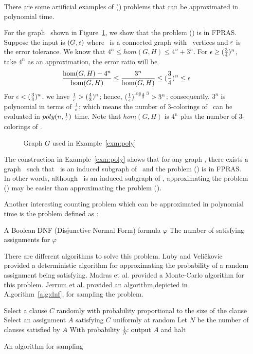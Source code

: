 There are some artificial examples of \ccsp(\mrelset) problems that can be approximated 
in polynomial time. 

\begin{example} \label{exm:poly}
For the graph \mH\ shown in Figure~\ref{fig:approxible},
we show that the problem \chom(\mH) is in FPRAS\@. Suppose the input is 
\((G,\epsilon)\) where \mG\ is a connected graph with \mn\ vertices and \(\epsilon\)
is the error tolerance.
We know that 
\(4^n\le hom(G,H) \le 4^n+3^n\)\@.
For \(\epsilon \ge (\frac{3}{4})^n\), take \(4^n\) as an approximation, the error ratio will  be
\[\frac{\hom(G,H)-4^n}{\hom(G,H)} \le \frac{3^n}{\hom(G,H)} \le (\frac{3}{4})^n \le \epsilon\]
For \(\epsilon < (\frac{3}{4})^n\), we have \(\frac{1}{\epsilon}>(\frac{4}{3})^n \);
hence, \((\frac{1}{\epsilon})^{\log_{\frac{4}{3}}3} > 3^n\); consequently, \(3^n\) is polynomial 
in terms of \(\frac{1}{\epsilon}\); which means the number of 3-colorings of \mG\ can be evaluated in 
\(poly(n,\frac{1}{\epsilon})\) time. 
Note that \(hom(G,H)\) is \(4^n\) plus the number of 3-colorings of \mG\@.

\begin{figure}[h] 
\center
\caption{Graph \ensuremath{G} used in Example~\ref{exm:poly}}
\label{fig:approxible}
\end{figure}
\end{example}

The construction in Example~\ref{exm:poly} shows that for any graph \mG,
there exists a graph \mH\ such that \mG\
is an induced subgraph of \mH\ and the problem \chom(\mH) is in FPRAS\@.
In other words, although \mG\ is an induced subgraph of \mH, approximating
the problem \chom(\mH)
may be easier than approximating the problem \chom(\mG)\@.

Another interesting counting problem which can be approximated in polynomial time is 
the \pname{\#Dual-SAT} problem defined as :

\pnndef %
{A Boolean DNF (Disjunctive Normal Form) formula \(\varphi\)}
{The number of satisfying assignments for \(\varphi\)}

There are different algorithms to solve this problem.
Luby and Veli\v{c}kovic \cite{Luby} provided a deterministic algorithm for
approximating the probability of a random assignment being satisfying. 
Madras et al. \cite{Madras} provided a Monte-Carlo algorithm
for this problem. Jerrum et al. \cite{JVV} provided an algorithm,depicted in Algorithm~\ref{alg:dnf},
for sampling the \pname{Dual-SAT} problem. 
\begin{algorithm}[h]
\begin{algorithmic}
       \STATE Select a clause \(C\) randomly with probability proportional to the size of the clause
       \STATE Select an assignment \(A\) satisfying \(C\) uniformly at random
       \STATE Let \(N\) be the number of clauses satisfied by \(A\)
       \STATE With probability \(\frac{1}{N}\): output \(A\) and halt
\ENDWHILE
\end{algorithmic}
\caption{An algorithm for sampling }\label{alg:dnf}
\end{algorithm}

